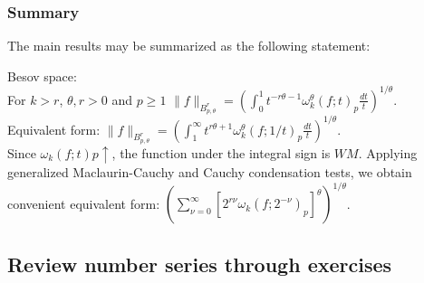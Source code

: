 \subsubsection{Summary}
The main results may be summarized as the following statement: \\
\begin{ex*}
    Besov space: \\
    For $k > r$, $\theta, r > 0$ and $p \geq 1$ $\|f\|_{B^r_{p,\theta}} = \left( \int_0^1 t^{-r\theta-1} \omega_k^\theta (f;t)_p \frac{dt}{t} \right)^{1/\theta}$. \\
    Equivalent form: $\|f\|_{B^r_{p,\theta}} = \left( \int_1^\infty t^{r\theta+1} \omega_k^\theta (f;1/t)_p \frac{dt}{t} \right)^{1/\theta}$. \\
    Since $\omega_k(f; t)p \uparrow$, the function under the integral sign is $WM$. Applying generalized Maclaurin-Cauchy and Cauchy condensation tests, we obtain convenient equivalent form: $\left( \sum_{\nu=0}^{\infty} \left[ 2^{r\nu} \omega_k(f; 2^{-\nu})_p \right]^{\theta} \right)^{1/\theta}$.
\end{ex*}

\newpage
\subsection{Review number series through exercises}
